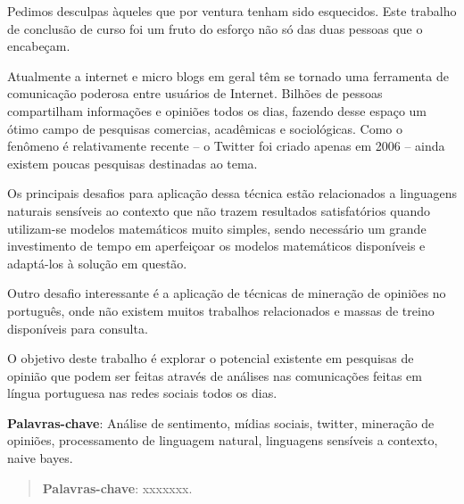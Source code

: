 Pedimos desculpas àqueles que por ventura tenham sido esquecidos. Este trabalho de conclusão de curso foi um fruto do esforço não só das duas pessoas que o encabeçam.
\begin{resumo}

Atualmente a internet e micro blogs em geral têm se tornado uma ferramenta de comunicação poderosa entre usuários de Internet. Bilhões de pessoas compartilham informações e opiniões todos os dias, fazendo desse espaço um ótimo campo de pesquisas comercias, acadêmicas e sociológicas.  Como o fenômeno é relativamente recente – o Twitter foi criado apenas em 2006 – ainda existem poucas pesquisas destinadas ao tema.

Os principais desafios para aplicação dessa técnica estão relacionados a linguagens naturais sensíveis ao contexto que não trazem resultados satisfatórios quando utilizam-se modelos matemáticos muito simples, sendo necessário um grande investimento de tempo em aperfeiçoar os modelos matemáticos disponíveis e adaptá-los à solução em questão.

Outro desafio interessante é a aplicação de técnicas de mineração de opiniões no português, onde não existem muitos trabalhos relacionados e massas de treino disponíveis para consulta.

O objetivo deste trabalho é explorar o potencial existente em pesquisas de opinião que podem ser feitas através de análises nas comunicações feitas em língua portuguesa nas redes sociais todos os dias.

{\hspace{-8mm} \bf{Palavras-chave}}: Análise de sentimento, mídias sociais, twitter, mineração de opiniões, processamento de linguagem natural, linguagens sensíveis a contexto, naive bayes.

\acresetall

\end{resumo}

\begin{abstract}


{\hspace{-8mm} \bf{Palavras-chave}}: xxxxxxx.


\acresetall

\end{abstract}

